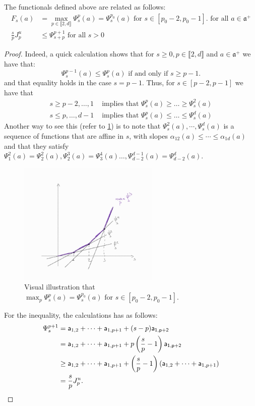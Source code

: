 \documentclass{report}
\begin{document}
\begin{lemma}\label{lem:functional_relations}
The functionals defined above are related as follows:
\begin{align*}
    F_s(a) &= \max_{p \in \llbracket 2, d \rrbracket} \Psi_s^p(a) = \Psi_s^{p_0}(a) \text{ for } s \in [p_0 - 2, p_0 -1]. \text{ for all } a \in \mathfrak a^+\\
    \frac{s}{p} J_{p}^u &\leq \Psi_{s+p}^{p + 1} \text{ for all } s > 0
\end{align*}
\end{lemma}
\begin{proof}
Indeed, a quick calculation shows that for $s \geq 0, p \in \llbracket 2, d \rrbracket$ and $a \in \mathfrak a^+$ we have that:
\[
    \Psi_s^{p-1}(a) \leq \Psi_s^p(a) \text{ if and only if } s \geq p-1.
\]
and that equality holds in the case $s = p - 1$.
Thus, for $s \in [p - 2, p-1]$ we have that
\begin{align*}
    s \geq p-2, \ldots, 1 &\text{ implies that } \Psi_s^p(a) \geq \ldots \geq \Psi_s^{2}(a)\\
    s \leq p, \ldots, d-1 &\text{ implies that } \Psi_s^p(a) \leq \ldots \leq \Psi_s^d(a)
\end{align*}
Another way to see this (refer to \cref{fig:max}) is to note that $\Psi_s^2(a), \cdots, \Psi_s^d(a)$ is a sequence of functions that are affine in $s$, with slopes $\alpha_{12}(a) \leq \cdots \leq \alpha_{1d}(a)$ and that they satisfy $\Psi_1^2(a) = \Psi_2^2(a), \Psi_2^3(a) = \Psi_3^4(a) \ldots, \Psi_{d-2}^{d-1}(a) = \Psi_{d-2}^d(a)$.
\begin{figure}[h]
    \centering
    \includegraphics[width=0.6\textwidth]{max.jpg}
    \caption{Visual illustration that $\max_p\Psi_s^p(a) = \Psi_s^{p_0}(a) \text{ for } s \in [p_0 - 2, p_0 -1]$.}
    \label{fig:max}
\end{figure}

For the inequality, the calculations has as follows:
\begin{align*}
    \Psi_s^{p + 1} &=
    {\sf a}_{1,2} + \cdots + {\sf a}_{1,p + 1} + (s-p) {\sf a_{1,p+2}}\\
    &= 
    {\sf a}_{1,2} + \cdots + {\sf a}_{1,p + 1} + p\left(\frac{s}{p}-1\right) {\sf a_{1,p+2}}\\
    &\geq
    {\sf a}_{1,2} + \cdots + {\sf a}_{1,p + 1} + \left(\frac{s}{p}-1\right) ({\sf a}_{1,2} + \cdots + {\sf a}_{1,p + 1})\\
    &=
    \frac{s}{p} J_{p}^u.
\end{align*}

\end{proof}
\end{document}
